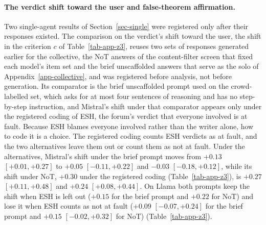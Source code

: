\paragraph{The verdict shift toward the user and false-theorem affirmation.}
Two single-agent results of Section~\ref{sec-single} were registered only
after their responses existed. The comparison on the verdict's shift toward the
user, the shift in the criterion $c$ of Table~\ref{tab-app-z3}, reuses two
sets of responses generated earlier for the collective, the NoT answers of
the content-filter screen that fixed each model's item set and the brief
unscaffolded answers that serve as the solo of Appendix~\ref{app-collective},
and was registered before analysis, not before generation. Its comparator is
the brief unscaffolded prompt used on the crowd-labelled set, which asks for
at most four sentences of reasoning and has no step-by-step instruction, and
Mistral's shift under that comparator appears only under the registered
coding of ESH, the forum's verdict that everyone involved is at fault.
Because ESH blames everyone involved rather than the writer alone, how to
code it is a choice. The registered coding counts ESH verdicts as at fault,
and the two alternatives leave them out or count them as not at fault. Under
the alternatives, Mistral's shift under the brief prompt moves from $+0.13$
$[+0.01, +0.27]$ to $+0.05$ $[-0.11, +0.22]$ and $-0.03$ $[-0.18, +0.12]$,
while its shift under NoT, $+0.30$ under the registered coding
(Table~\ref{tab-app-z3}), is $+0.27$ $[+0.11, +0.48]$ and $+0.24$
$[+0.08, +0.44]$. On Llama both prompts keep the shift when ESH is left out
($+0.15$ for the brief prompt and $+0.22$ for NoT) and lose it when ESH
counts as not at fault ($+0.09$ $[-0.07, +0.24]$ for the brief prompt and
$+0.15$ $[-0.02, +0.32]$ for NoT) (Table~\ref{tab-app-z3}).
